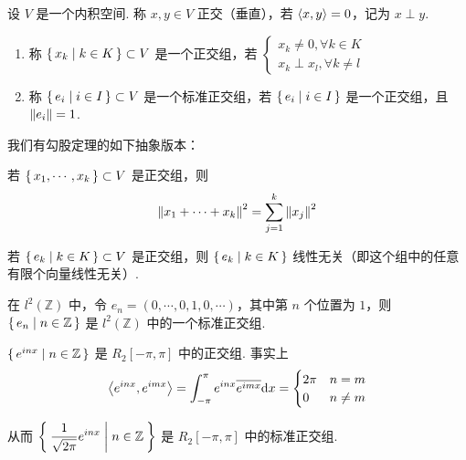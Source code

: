 
\begin{definition}
    设 $V$ 是一个内积空间. 称 $x,y\in V$ 正交（垂直），若 $\left\langle{x,y}\right\rangle=0$，记为 $x\perp y$.
\end{definition}

\begin{definition}    
    \begin{enumerate}
        \item 称 $\set{x_k|k\in K}\subset V$ 是一个正交组，若 $\begin{cases}
            x_k\ne 0,\forall k\in K\\
            x_k\perp x_l,\forall k\ne l
        \end{cases}$

        \item 称 $\set{e_i|i\in I}\subset V$ 是一个标准正交组，若 $\set{e_i|i\in I}$ 是一个正交组，且 $\left\lVert{e_i}\right\rVert=1$.
    \end{enumerate}
\end{definition}

我们有勾股定理的如下抽象版本：

\begin{property}
    若 $\set{x_1,\cdots,x_k}\subset V$ 是正交组，则
$$
\left\lVert{x_1+\cdots+x_k}\right\rVert^2=\sum_{j=1}^k\left\lVert{x_j}\right\rVert^2
$$
\end{property}

\begin{property}
    若 $\set{e_k|k\in K}\subset V$ 是正交组，则 $\set{e_k|k\in K}$ 线性无关（即这个组中的任意有限个向量线性无关）.
\end{property}

\begin{example}
    在 $l^2(\mathbb{Z})$ 中，令 $e_n=(0,\cdots,0,1,0,\cdots)$，其中第 $n$ 个位置为 $1$，则 $\set{e_n|n\in\mathbb{Z}}$ 是 $l^2(\mathbb{Z})$ 中的一个标准正交组.
\end{example}

\begin{example}
    $\set{e^{inx}|n\in\mathbb{Z}}$ 是 $R_2[-\pi,\pi]$ 中的正交组. 事实上
$$
\left\langle{e^{inx},e^{imx}}\right\rangle=\int_{-\pi}^{\pi}e^{inx}\overline{e^{imx}}\mathrm{d} x=\begin{cases}
    2\pi & n=m\\
    0 & n\ne m
\end{cases}
$$

    从而 $\displaystyle\Set{\frac{1}{\sqrt{2\pi}}e^{inx}|n\in\mathbb{Z}}$ 是 $R_2[-\pi,\pi]$ 中的标准正交组.
\end{example}

